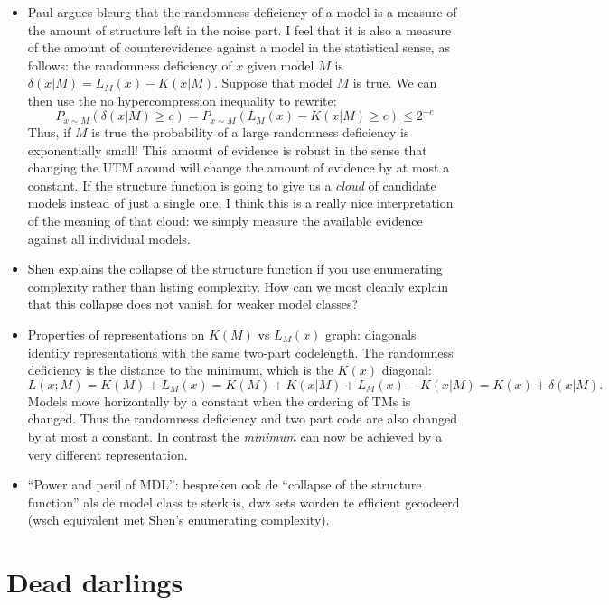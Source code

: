 \documentclass{style/llncs}
\begin{document}
\begin{itemize}
\item Paul argues bleurg that the randomness deficiency of a model is a measure of the amount of structure left in the noise part. I feel that it is also a measure of the amount of counterevidence against a model in the statistical sense, as follows: the randomness deficiency of $x$ given model $M$ is $\delta(x|M)=L_M(x)-K(x|M)$. Suppose that model $M$ is true. We can then use the no hypercompression inequality to rewrite:
%
\[
P_{x\sim M}(\delta(x|M)\ge c) = P_{x\sim M}(L_M(x) - K(x|M) \ge c)\le 2^{-c}
\]
Thus, if $M$ is true the probability of a large randomness deficiency is exponentially small! This amount of evidence is robust in the sense that changing the UTM around will change the amount of evidence by at most a constant. If the structure function is going to give us a \emph{cloud} of candidate models instead of just a single one, I think this is a really nice interpretation of the meaning of that cloud: we simply measure the available evidence against all individual models.  

\item Shen explains the collapse of the structure function if you use enumerating complexity rather than listing complexity. How can we most cleanly explain that this collapse does not vanish for weaker model classes?

\item Properties of representations on $K(M)$ vs $L_M(x)$ graph: diagonals identify representations with the same two-part codelength. The randomness deficiency is the distance to the minimum, which is the $K(x)$ diagonal:
\[L(x;M)=K(M)+L_M(x) =K(M)+K(x|M)+L_M(x)-K(x|M)  = K(x)+\delta(x|M).\]
 Models move horizontally by a constant when the ordering of TMs is changed. Thus the randomness deficiency and two part code are also changed by at most a constant. In contrast the \emph{minimum} can now be achieved by a very different representation.

\item ``Power and peril of MDL'': bespreken ook de ``collapse of the structure function'' als de model class te sterk is, dwz sets worden te efficient gecodeerd (wsch equivalent met Shen's enumerating complexity).

\end{itemize}

\appendix
\section{Dead darlings}
\end{document}
